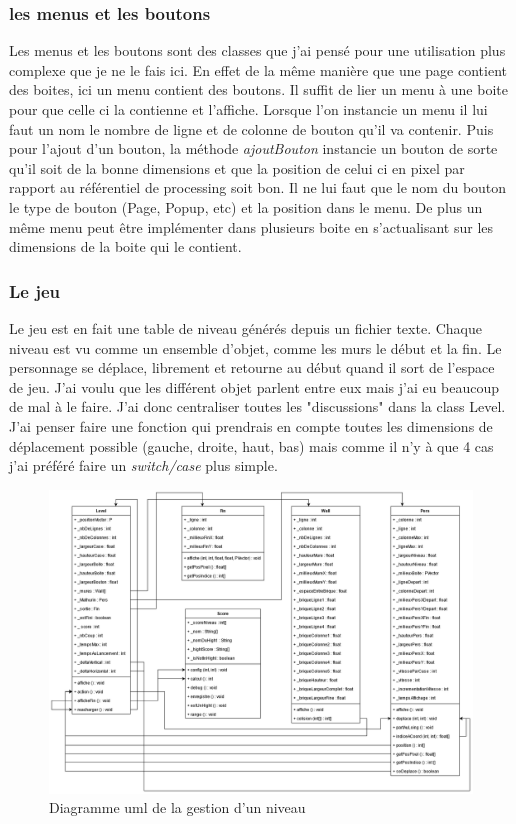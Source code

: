 \documentclass[10pt,a4paper]{article}
\begin{document}
\subsubsection{les menus et les boutons}
Les menus et les boutons sont des classes que j'ai pensé pour une utilisation plus complexe que je ne le fais ici. En effet de la même manière que une page contient des boites, ici un menu contient des boutons. Il suffit de lier un menu à une boite pour que celle ci la contienne et l'affiche. Lorsque l'on instancie un menu il lui faut un nom le nombre de ligne et de colonne de bouton qu'il va contenir. Puis pour l'ajout d'un bouton, la méthode \textit{ajoutBouton} instancie un bouton de sorte qu'il soit de la bonne dimensions et que la position de celui ci en pixel par rapport au référentiel de processing soit bon. Il ne lui faut que le nom du bouton le type de bouton (Page, Popup, etc) et la position dans le menu. De plus un même menu peut être implémenter dans plusieurs boite en s'actualisant sur les dimensions de la boite qui le contient.
\subsubsection{Le jeu}
Le jeu est en fait une table de niveau générés depuis un fichier texte. Chaque niveau est vu comme un ensemble d'objet, comme les murs le début et la fin. Le personnage se déplace, librement et retourne au début quand il sort de l'espace de jeu. J'ai voulu que les différent objet parlent entre eux mais j'ai eu beaucoup de mal à le faire. J'ai donc centraliser toutes les "discussions" dans la class Level. J'ai penser faire une fonction qui prendrais en compte toutes les dimensions de déplacement possible (gauche, droite, haut, bas) mais comme il n'y à que 4 cas j'ai préféré faire un \textit{switch/case} plus simple. 
\begin{figure}[h!]
	\centering
	\includegraphics[width=1\textwidth]{Niveau.png}
  	\caption{Diagramme uml de la gestion d'un niveau}
  	\label{fig4}
\end{figure}
\end{document}
